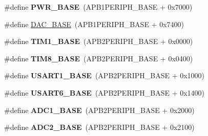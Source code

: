 \begin{DoxyCompactItemize}
\item 
\#define {\bfseries P\+W\+R\+\_\+\+B\+A\+SE}~(A\+P\+B1\+P\+E\+R\+I\+P\+H\+\_\+\+B\+A\+SE + 0x7000)\hypertarget{group___peripheral__memory__map_gac691ec23dace8b7a649a25acb110217a}{}\label{group___peripheral__memory__map_gac691ec23dace8b7a649a25acb110217a}

\item 
\#define \hyperlink{group___peripheral__memory__map_gad18d0b914c7f68cecbee1a2d23a67d38}{D\+A\+C\+\_\+\+B\+A\+SE}~(A\+P\+B1\+P\+E\+R\+I\+P\+H\+\_\+\+B\+A\+SE + 0x7400)
\item 
\#define {\bfseries T\+I\+M1\+\_\+\+B\+A\+SE}~(A\+P\+B2\+P\+E\+R\+I\+P\+H\+\_\+\+B\+A\+SE + 0x0000)\hypertarget{group___peripheral__memory__map_gaf8aa324ca5011b8173ab16585ed7324a}{}\label{group___peripheral__memory__map_gaf8aa324ca5011b8173ab16585ed7324a}

\item 
\#define {\bfseries T\+I\+M8\+\_\+\+B\+A\+SE}~(A\+P\+B2\+P\+E\+R\+I\+P\+H\+\_\+\+B\+A\+SE + 0x0400)\hypertarget{group___peripheral__memory__map_ga5b72f698b7a048a6f9fcfe2efe5bc1db}{}\label{group___peripheral__memory__map_ga5b72f698b7a048a6f9fcfe2efe5bc1db}

\item 
\#define {\bfseries U\+S\+A\+R\+T1\+\_\+\+B\+A\+SE}~(A\+P\+B2\+P\+E\+R\+I\+P\+H\+\_\+\+B\+A\+SE + 0x1000)\hypertarget{group___peripheral__memory__map_ga86162ab3f740db9026c1320d46938b4d}{}\label{group___peripheral__memory__map_ga86162ab3f740db9026c1320d46938b4d}

\item 
\#define {\bfseries U\+S\+A\+R\+T6\+\_\+\+B\+A\+SE}~(A\+P\+B2\+P\+E\+R\+I\+P\+H\+\_\+\+B\+A\+SE + 0x1400)\hypertarget{group___peripheral__memory__map_gade4d3907fd0387ee832f426f52d568bb}{}\label{group___peripheral__memory__map_gade4d3907fd0387ee832f426f52d568bb}

\item 
\#define {\bfseries A\+D\+C1\+\_\+\+B\+A\+SE}~(A\+P\+B2\+P\+E\+R\+I\+P\+H\+\_\+\+B\+A\+SE + 0x2000)\hypertarget{group___peripheral__memory__map_ga695c9a2f892363a1c942405c8d351b91}{}\label{group___peripheral__memory__map_ga695c9a2f892363a1c942405c8d351b91}

\item 
\#define {\bfseries A\+D\+C2\+\_\+\+B\+A\+SE}~(A\+P\+B2\+P\+E\+R\+I\+P\+H\+\_\+\+B\+A\+SE + 0x2100)\hypertarget{group___peripheral__memory__map_ga6544abc57f9759f610eee09a02442ae6}{}\label{group___peripheral__memory__map_ga6544abc57f9759f610eee09a02442ae6}


\end{DoxyCompactItemize}
